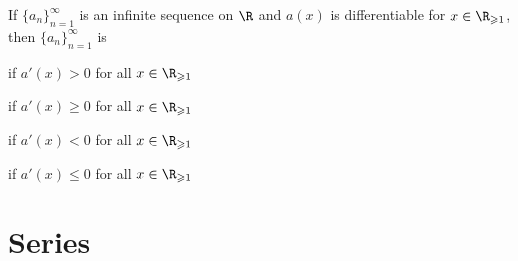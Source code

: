 \documentclass{article}
\begin{document}
\begin{multicols}{2}
\begin{tcolorboxcols}[title={Derivative Test}]
\begin{theorem}
            If \(\{a_n\}^\infty_{n=1}\) is an infinite sequence on \(\R\) and
            \(a(x)\) is differentiable for \(x\in\R_{\geqslant1}\),
            then \(\{a_n\}^\infty_{n=1}\) is
        \end{theorem}
        \begin{description}[style=sameline]
            \item[Strictly increasing] if \(a'(x) > 0\) for all \(x\in\R_{\geqslant 1}\)
            \item[Increasing] if \(a'(x) \geqslant 0\) for all \(x\in\R_{\geqslant 1}\)
            \item[Strictly decreasing] if \(a'(x) < 0\) for all \(x\in\R_{\geqslant 1}\)
            \item[Decreasing] if \(a'(x) \leqslant 0\) for all \(x\in\R_{\geqslant 1}\)
        \end{description}
    \end{tcolorboxcols}
\end{multicols}
%
\pagebreak
\section{Series}
\end{document}

